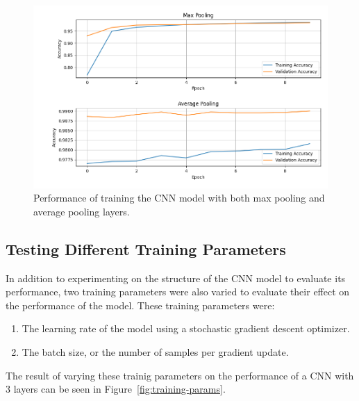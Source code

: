 \documentclass[a4paper]{article}
\begin{document}
\begin{figure}[h!]
    \centering
    \includegraphics[scale=0.5]{images/max-avg-pooling-cnn.png}
    \caption{Performance of training the CNN model with both max pooling and average pooling layers.}
    \label{fig:pooling}
\end{figure}

\subsection{Testing Different Training Parameters}
In addition to experimenting on the structure of the CNN model to evaluate its performance, two training parameters were also varied to evaluate their effect on the performance of the model. These training parameters were:
\begin{enumerate}
    \item The learning rate of the model using a stochastic gradient descent optimizer.
    \item The batch size, or the number of samples per gradient update.
\end{enumerate}
The result of varying these trainig parameters on the performance of a CNN with 3 layers can be seen in Figure~\ref{fig:training-params}.
\end{document}
